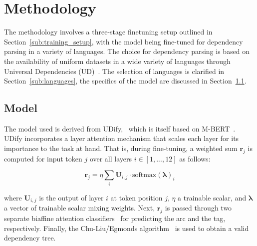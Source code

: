 
\section{Methodology}
\label{sec:methodology}

The methodology involves a three-stage finetuning setup outlined in Section~\ref{sub:training_setup}, with the model being fine-tuned for dependency parsing in a variety of languages. The choice for dependency parsing is based on the availability of uniform datasets in a wide variety of languages through Universal Dependencies (UD)~\cite{nivre-etal-2016-universal}. The selection of languages is clarified in Section~\ref{sub:languages}, the specifics of the model are discussed in Section~\ref{sub:model}.

\subsection{Model}
\label{sub:model}
	The model used is derived from UDify,~\cite{kondratyuk-straka-2019-75} which is itself based on M-BERT~\cite{devlin-etal-2019-bert}. UDify incorporates a layer attention mechanism that scales each layer for its importance to the task at hand. That is, during fine-tuning, a weighted sum $\mathbf{r}_j$ is computed for input token $j$ over all layers $i \in [1, ..., 12]$ as follows:

	$$
		\mathbf{r}_j = \eta\sum_i\mathbf{U}_{i,j} \cdot \text{softmax}(\mathbf{\lambda})_i
	$$

	\noindent where $\mathbf{U}_{i,j}$ is the output of layer $i$ at token position $j$, $\eta$ a trainable scalar, and $\mathbf{\lambda}$ a vector of trainable scalar mixing weights. Next, $\mathbf{r}_j$ is passed through two separate biaffine attention classifiers~\cite{dozat-manning-2016-deep} for predicting the arc and the tag, respectively. Finally, the Chu-Liu/Egmonds algorithm~\cite{chu-1965-shortest} is used to obtain a valid dependency tree.

